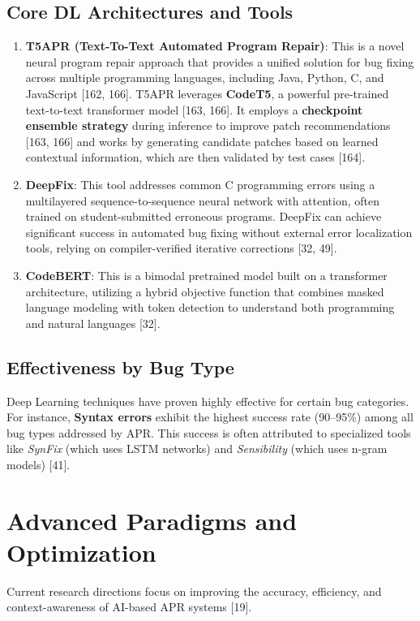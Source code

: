 \subsection{Core DL Architectures and Tools}
\begin{enumerate}
    \item \textbf{T5APR (Text-To-Text Automated Program Repair)}: This is a novel neural program repair approach that provides a unified solution for bug fixing across multiple programming languages, including Java, Python, C, and JavaScript [162, 166]. T5APR leverages \textbf{CodeT5}, a powerful pre-trained text-to-text transformer model [163, 166]. It employs a \textbf{checkpoint ensemble strategy} during inference to improve patch recommendations [163, 166] and works by generating candidate patches based on learned contextual information, which are then validated by test cases [164].
    \item \textbf{DeepFix}: This tool addresses common C programming errors using a multilayered sequence-to-sequence neural network with attention, often trained on student-submitted erroneous programs. DeepFix can achieve significant success in automated bug fixing without external error localization tools, relying on compiler-verified iterative corrections [32, 49].
    \item \textbf{CodeBERT}: This is a bimodal pretrained model built on a transformer architecture, utilizing a hybrid objective function that combines masked language modeling with token detection to understand both programming and natural languages [32].
\end{enumerate}

\subsection{Effectiveness by Bug Type}
Deep Learning techniques have proven highly effective for certain bug categories. For instance, \textbf{Syntax errors} exhibit the highest success rate (90–95\%) among all bug types addressed by APR. This success is often attributed to specialized tools like \emph{SynFix} (which uses LSTM networks) and \emph{Sensibility} (which uses n-gram models) [41].

\section{Advanced Paradigms and Optimization}

Current research directions focus on improving the accuracy, efficiency, and context-awareness of AI-based APR systems [19].

